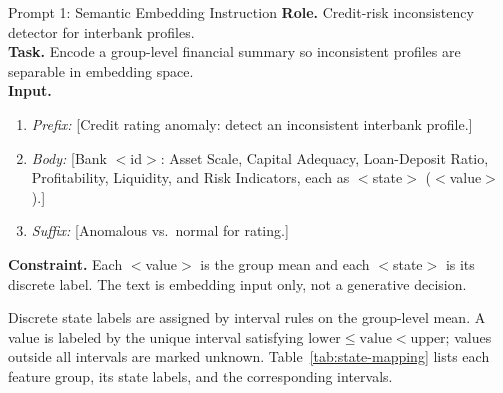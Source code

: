 \documentclass[lettersize,journal]{IEEEtran}
\begin{document}
\begin{promptbox}{Prompt 1: Semantic Embedding Instruction}
\textbf{Role.} Credit-risk inconsistency detector for interbank profiles.\\
\textbf{Task.} Encode a group-level financial summary so inconsistent profiles are separable in embedding space.\\
\textbf{Input.}
\begin{enumerate}[leftmargin=1.15em,itemsep=0.5pt,topsep=1pt,parsep=0pt,partopsep=0pt]
\item \textit{Prefix:} [Credit rating anomaly: detect an inconsistent interbank profile.]
\item \textit{Body:} [Bank $<$id$>$: Asset Scale, Capital Adequacy, Loan-Deposit Ratio, Profitability, Liquidity, and Risk Indicators, each as $<$state$>$ ($<$value$>$).]
\item \textit{Suffix:} [Anomalous vs.\ normal for rating.]
\end{enumerate}
\textbf{Constraint.} Each $<$value$>$ is the group mean and each $<$state$>$ is its discrete label. The text is embedding input only, not a generative decision.
\end{promptbox}

Discrete state labels are assigned by interval rules on the group-level mean.
A value is labeled by the unique interval satisfying $\mathrm{lower}\le\mathrm{value}<\mathrm{upper}$; values outside all intervals are marked unknown.
Table~\ref{tab:state-mapping} lists each feature group, its state labels, and the corresponding intervals.
\end{document}
